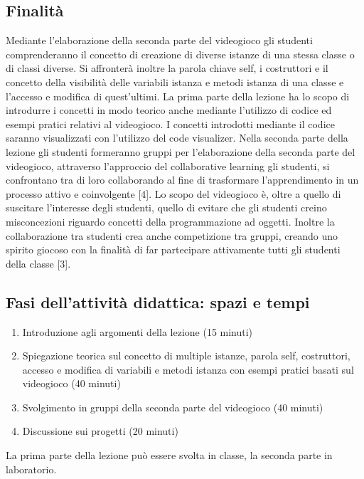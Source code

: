 \documentclass[12pt,a4paper]{article}
\begin{document}
\subsection*{Finalità}
Mediante l’elaborazione della seconda parte del videogioco gli studenti comprenderanno il concetto di creazione di diverse istanze di una stessa classe o di classi diverse. Si affronterà inoltre la parola chiave self, i costruttori e il concetto della visibilità delle variabili istanza e metodi istanza di una classe e l’accesso e modifica di quest’ultimi. La prima parte della lezione ha lo scopo di introdurre i concetti in modo teorico anche mediante l’utilizzo di codice ed esempi pratici relativi al videogioco. I concetti introdotti mediante il codice saranno visualizzati con l’utilizzo del code visualizer. Nella seconda parte della lezione gli studenti formeranno gruppi per l’elaborazione della seconda parte del videogioco, attraverso l’approccio del collaborative learning gli studenti, si confrontano tra di loro collaborando al fine di trasformare l’apprendimento in un processo attivo e coinvolgente [4]. Lo scopo del videogioco è, oltre a quello di suscitare l’interesse degli studenti, quello di evitare che gli studenti creino misconcezioni riguardo concetti della programmazione ad oggetti. Inoltre la collaborazione tra studenti crea anche competizione tra gruppi, creando uno spirito giocoso con la finalità di far partecipare attivamente tutti gli studenti della classe [3].


\subsection*{Fasi dell'attività didattica: spazi e tempi}

\begin{enumerate}
	\item Introduzione agli argomenti della lezione (15 minuti)
	\item Spiegazione teorica sul concetto di multiple istanze, parola self, costruttori, accesso e modifica di variabili e metodi istanza con esempi pratici basati sul videogioco (40 minuti)
	\item Svolgimento in gruppi della seconda parte del videogioco (40 minuti)
	\item Discussione sui progetti (20 minuti)
\end{enumerate}
La prima parte della lezione può essere svolta in classe, la seconda parte in laboratorio.
\end{document}
